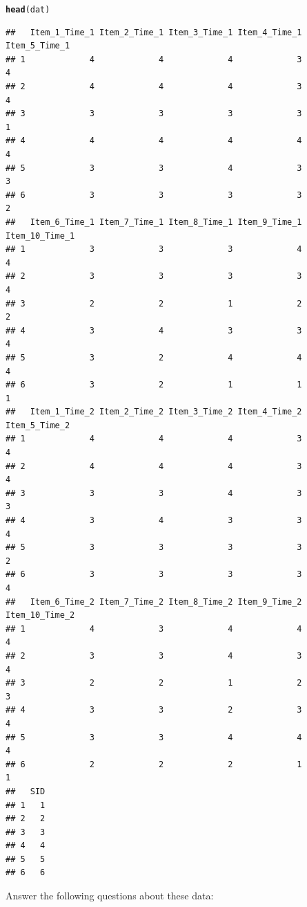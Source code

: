 \documentclass{article}\usepackage[]{graphicx}\usepackage[]{color}
\makeatletter
\newcommand{\hlstd}[1]{\textcolor[rgb]{0.345,0.345,0.345}{#1}}%
\newcommand{\hlkwd}[1]{\textcolor[rgb]{0.737,0.353,0.396}{\textbf{#1}}}%
\newenvironment{kframe}{%
 \def\at@end@of@kframe{}%
 \ifinner\ifhmode%
  \def\at@end@of@kframe{\end{minipage}}%
  \begin{minipage}{\columnwidth}%
 \fi\fi%
 \def\FrameCommand##1{\hskip\@totalleftmargin \hskip-\fboxsep
 \colorbox{shadecolor}{##1}\hskip-\fboxsep
     \hskip-\linewidth \hskip-\@totalleftmargin \hskip\columnwidth}%
 \MakeFramed {\advance\hsize-\width
   \@totalleftmargin\z@ \linewidth\hsize
   \@setminipage}}%
 {\par\unskip\endMakeFramed%
 \at@end@of@kframe}
\newenvironment{knitrout}{}{} %
\makeatother
\begin{document}
\begin{knitrout}
\begin{kframe}
\begin{alltt}
\hlkwd{head}\hlstd{(dat)}
\end{alltt}
\begin{verbatim}
##   Item_1_Time_1 Item_2_Time_1 Item_3_Time_1 Item_4_Time_1 Item_5_Time_1
## 1             4             4             4             3             4
## 2             4             4             4             3             4
## 3             3             3             3             3             1
## 4             4             4             4             4             4
## 5             3             3             4             3             3
## 6             3             3             3             3             2
##   Item_6_Time_1 Item_7_Time_1 Item_8_Time_1 Item_9_Time_1 Item_10_Time_1
## 1             3             3             3             4              4
## 2             3             3             3             3              4
## 3             2             2             1             2              2
## 4             3             4             3             3              4
## 5             3             2             4             4              4
## 6             3             2             1             1              1
##   Item_1_Time_2 Item_2_Time_2 Item_3_Time_2 Item_4_Time_2 Item_5_Time_2
## 1             4             4             4             3             4
## 2             4             4             4             3             4
## 3             3             3             4             3             3
## 4             3             4             3             3             4
## 5             3             3             3             3             2
## 6             3             3             3             3             4
##   Item_6_Time_2 Item_7_Time_2 Item_8_Time_2 Item_9_Time_2 Item_10_Time_2
## 1             4             3             4             4              4
## 2             3             3             4             3              4
## 3             2             2             1             2              3
## 4             3             3             2             3              4
## 5             3             3             4             4              4
## 6             2             2             2             1              1
##   SID
## 1   1
## 2   2
## 3   3
## 4   4
## 5   5
## 6   6
\end{verbatim}
\end{kframe}
\end{knitrout}

Answer the following questions about these data:
\end{document}
